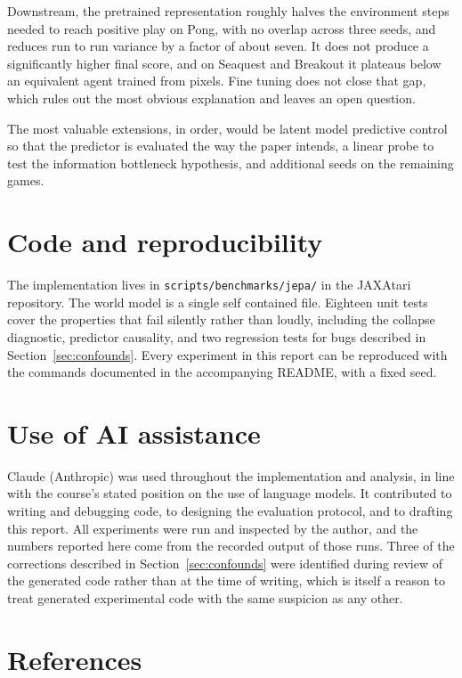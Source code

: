\documentclass[11pt,a4paper]{article}
\begin{document}
Downstream, the pretrained representation roughly halves the environment steps
needed to reach positive play on Pong, with no overlap across three seeds, and
reduces run to run variance by a factor of about seven. It does not produce a
significantly higher final score, and on Seaquest and Breakout it plateaus below an
equivalent agent trained from pixels. Fine tuning does not close that gap, which
rules out the most obvious explanation and leaves an open question.

The most valuable extensions, in order, would be latent model predictive control so
that the predictor is evaluated the way the paper intends, a linear probe to test
the information bottleneck hypothesis, and additional seeds on the remaining games.

\section*{Code and reproducibility}

The implementation lives in \texttt{scripts/benchmarks/jepa/} in the JAXAtari
repository. The world model is a single self contained file. Eighteen unit tests
cover the properties that fail silently rather than loudly, including the collapse
diagnostic, predictor causality, and two regression tests for bugs described in
Section~\ref{sec:confounds}. Every experiment in this report can be reproduced with
the commands documented in the accompanying README, with a fixed seed.

\section*{Use of AI assistance}

Claude (Anthropic) was used throughout the implementation and analysis, in line
with the course's stated position on the use of language models. It contributed to
writing and debugging code, to designing the evaluation protocol, and to drafting
this report. All experiments were run and inspected by the author, and the numbers
reported here come from the recorded output of those runs. Three of the corrections
described in Section~\ref{sec:confounds} were identified during review of the
generated code rather than at the time of writing, which is itself a reason to
treat generated experimental code with the same suspicion as any other.

\section*{References}
\end{document}
